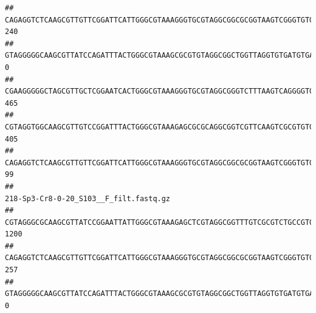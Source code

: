 \documentclass[]{article}
\begin{document}
\begin{verbatim}
## CAGAGGTCTCAAGCGTTGTTCGGATTCATTGGGCGTAAAGGGTGCGTAGGCGGCGCGGTAAGTCGGGTGTGAAATCTCGGAGCTTAACTCCGAAACTGCATTCGATACTGCCGTGCTTGAGGACTGGAGAGGAGACTGGAATTTACGGTGTAGCGGTGAAATGCGTAGATATCGTAAGGAAGACCAGTGGCGAAGGCGGGTCTCTGGACAGTTCCTGACGCTGAGGCACGAAGGCCAGGGGAGCAAACG                                    240
## GTAGGGGGCAAGCGTTATCCAGATTTACTGGGCGTAAAGCGCGTGTAGGCGGCTGGTTAGGTGTGATGTGAAATCTTCCGGCTCAACCGGAAAACTGCATTGCAAACCGGCCTGGCTAGAGTGCAGGAGAGGGAAGCGGAATTCCAGGTGTAGCGGTGAAATGCGTAGATATCTGGAGGAACACCAGTGGCGAAGGCGGCTTCCTGGCCTGCAACTGACGCTGAGACGCGAAAGCGTGGGGAGCGAAC                                       0
## CGAAGGGGGCTAGCGTTGCTCGGAATCACTGGGCGTAAAGGGTGCGTAGGCGGGTCTTTAAGTCAGGGGTGAAATCCTGGAGCTCAACTCCAGAACTGCCTTTGATACTGAAGATCTTGAGTTCGGGAGAGGTGAGTGGAACTGCGAGTGTAGAGGTGAAATTCGTAGATATTCGCAAGAACACCAGTGGCGAAGGCGGCTCACTGGCCCGATACTGACGCTGAGGCACGAAAGCGTGGGGAGCAAACA                                    465
## CGTAGGTGGCAAGCGTTGTCCGGATTTACTGGGCGTAAAGAGCGCGCAGGCGGTCGTTCAAGTCGCGTGTGAAAGCCCCCGGCTCAACTGGGGAGGGTCACGCGATACTGATCGACTCGAAGGCAGGAGAGGGTAGTGGAATTCCCGGTGTAGTGGTGAAATGCGTAGATATCGGGAGGAACACCAGTGGCGAAGGCGACTACCTGGCCTGTTCTTGACGCTGAGGCGCGAAAGCTAGGGGAGCAAACG                                    405
## CAGAGGTCTCAAGCGTTGTTCGGATTCATTGGGCGTAAAGGGTGCGTAGGCGGCGCGGTAAGTCGGGTGTGAAATCTCGGGGCTTAACTCCGAAACTGCATTCGATACTGCCGTGCTTGAGGACTGGAGAGGAGACTGGAATTTACGGTGTAGCGGTGAAATGCGTAGATATCGTAAGGAAGACCAGTGGCGAAGGCGGGTCTCTGGACAGTTCCTGACGCTGAGGCACGAAGGCCAGGGGAGCAAACG                                     99
##                                                                                                                                                                                                                                                           218-Sp3-Cr8-0-20_S103__F_filt.fastq.gz
## CGTAGGGCGCAAGCGTTATCCGGAATTATTGGGCGTAAAGAGCTCGTAGGCGGTTTGTCGCGTCTGCCGTGAAAGTCCGGGGCTCAACTCCGGATCTGCGGTGGGTACGGGCAGACTAGAGTGATGTAGGGGAGACTGGAATTCCTGGTGTAGCGGTGAAATGCGCAGATATCAGGAGGAACACCGATGGCGAAGGCAGGTCTCTGGGCATTAACTGACGCTGAGGAGCGAAAGCATGGGGAGCGAACA                                   1200
## CAGAGGTCTCAAGCGTTGTTCGGATTCATTGGGCGTAAAGGGTGCGTAGGCGGCGCGGTAAGTCGGGTGTGAAATCTCGGAGCTTAACTCCGAAACTGCATTCGATACTGCCGTGCTTGAGGACTGGAGAGGAGACTGGAATTTACGGTGTAGCGGTGAAATGCGTAGATATCGTAAGGAAGACCAGTGGCGAAGGCGGGTCTCTGGACAGTTCCTGACGCTGAGGCACGAAGGCCAGGGGAGCAAACG                                    257
## GTAGGGGGCAAGCGTTATCCAGATTTACTGGGCGTAAAGCGCGTGTAGGCGGCTGGTTAGGTGTGATGTGAAATCTTCCGGCTCAACCGGAAAACTGCATTGCAAACCGGCCTGGCTAGAGTGCAGGAGAGGGAAGCGGAATTCCAGGTGTAGCGGTGAAATGCGTAGATATCTGGAGGAACACCAGTGGCGAAGGCGGCTTCCTGGCCTGCAACTGACGCTGAGACGCGAAAGCGTGGGGAGCGAAC                                       0

\end{verbatim}
\end{document}
